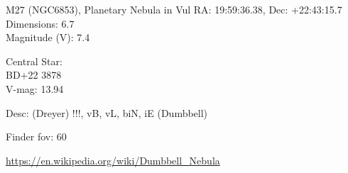 \begin{block}{M27 (NGC6853), Planetary Nebula in Vul}
    RA: 19:59:36.38, Dec: +22:43:15.7 \\ 
    Dimensions: 6.7 \\ 
    Magnitude (V): 7.4

    Central Star: \\ 
      \hspace{1em}BD+22 3878 \\ 
      \hspace{1em}V-mag: 13.94 

    Desc: (Dreyer) !!!, vB, vL, biN, iE (Dumbbell) 

    Finder fov: 60 

    \url{https://en.wikipedia.org/wiki/Dumbbell_Nebula} 
\end{block}
